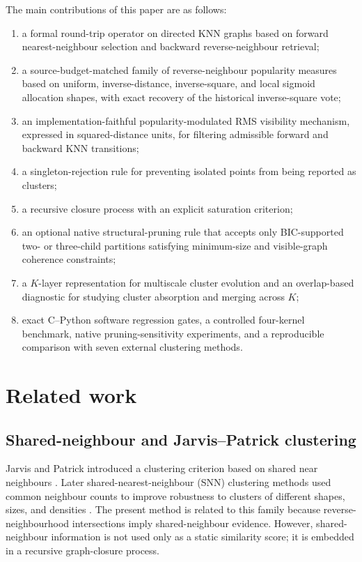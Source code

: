 \documentclass[pdflatex,sn-mathphys-num]{sn-jnl}
\begin{document}
The main contributions of this paper are as follows:
\begin{enumerate}
\item a formal round-trip operator on directed KNN graphs based on forward nearest-neighbour selection and backward reverse-neighbour retrieval;
\item a source-budget-matched family of reverse-neighbour popularity measures based on uniform, inverse-distance, inverse-square, and local sigmoid allocation shapes, with exact recovery of the historical inverse-square vote;
\item an implementation-faithful popularity-modulated RMS visibility mechanism, expressed in squared-distance units, for filtering admissible forward and backward KNN transitions;
\item a singleton-rejection rule for preventing isolated points from being reported as clusters;
\item a recursive closure process with an explicit saturation criterion;
\item an optional native structural-pruning rule that accepts only BIC-supported two- or three-child partitions satisfying minimum-size and visible-graph coherence constraints;
\item a $K$-layer representation for multiscale cluster evolution and an overlap-based diagnostic for studying cluster absorption and merging across $K$;
\item exact C--Python software regression gates, a controlled four-kernel benchmark, native pruning-sensitivity experiments, and a reproducible comparison with seven external clustering methods.
\end{enumerate}

\section{Related work}\label{sec:related}

\subsection{Shared-neighbour and Jarvis--Patrick clustering}

Jarvis and Patrick introduced a clustering criterion based on shared near neighbours \citep{JarvisPatrick1973}. Later shared-nearest-neighbour (SNN) clustering methods used common neighbour counts to improve robustness to clusters of different shapes, sizes, and densities \citep{Ertoz2003SNN}. The present method is related to this family because reverse-neighbourhood intersections imply shared-neighbour evidence. However, shared-neighbour information is not used only as a static similarity score; it is embedded in a recursive graph-closure process.
\end{document}
